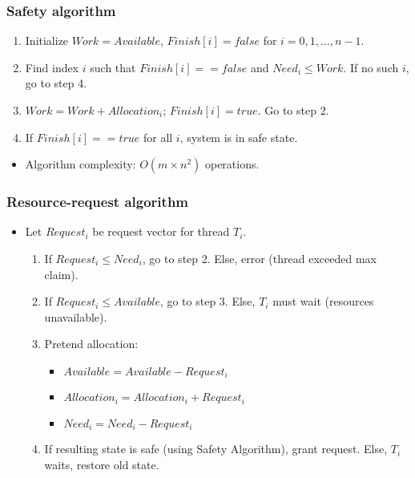 \subsubsection*{Safety algorithm}
\begin{enumerate}[noitemsep, topsep=0pt]
    \item Initialize $Work = Available$, $Finish[i] = false$ for $i = 0, 1, \dots, n-1$.
    \item Find index $i$ such that $Finish[i] == false$ and $Need_i \le Work$. If no such $i$, go to step 4.
    \item $Work = Work + Allocation_i$; $Finish[i] = true$. Go to step 2.
    \item If $Finish[i] == true$ for all $i$, system is in safe state.
\end{enumerate}
\begin{itemize}[noitemsep, topsep=0pt]
    \item Algorithm complexity: $O(m \times n^2)$ operations.
\end{itemize}

\subsubsection*{Resource-request algorithm}
\begin{itemize}[noitemsep, topsep=0pt]
    \item Let $Request_i$ be request vector for thread $T_i$.
    \begin{enumerate}[noitemsep, topsep=0pt]
        \item If $Request_i \le Need_i$, go to step 2. Else, error (thread exceeded max claim).
        \item If $Request_i \le Available$, go to step 3. Else, $T_i$ must wait (resources unavailable).
        \item Pretend allocation:
        \begin{itemize}[noitemsep, topsep=0pt]
            \item $Available = Available - Request_i$
            \item $Allocation_i = Allocation_i + Request_i$
            \item $Need_i = Need_i - Request_i$
        \end{itemize}
        \item If resulting state is safe (using Safety Algorithm), grant request. Else, $T_i$ waits, restore old state.
    \end{enumerate}
\end{itemize}

